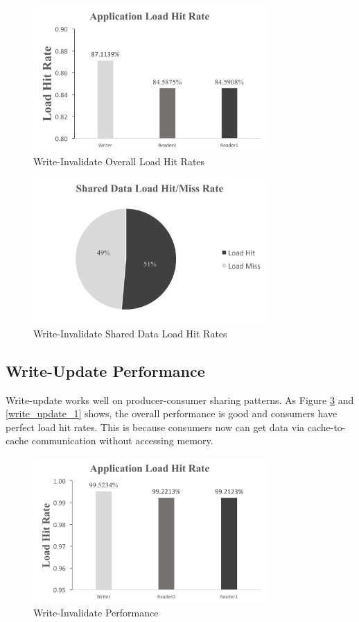 \documentclass[conference]{IEEEtran}
\begin{document}
\begin{figure}[!h]
\centering
\includegraphics[width=3.5in]{write_invalidate.png}
\caption{Write-Invalidate Overall Load Hit Rates}
\label{write_invalidate}
\end{figure}
\FloatBarrier

\begin{figure}[!h]
\centering
\includegraphics[width=3.5in]{write_invalidate_1.png}
\caption{Write-Invalidate Shared Data Load Hit Rates}
\label{write_invalidate_1}
\end{figure}
\FloatBarrier


\subsection{Write-Update Performance}
Write-update works well on producer-consumer sharing patterns. As Figure \ref{write_update} and \ref{write_update_1} shows, the overall performance is good and consumers have perfect load hit rates. This is because consumers now can get data via cache-to-cache communication without accessing memory.

\begin{figure}[!h]
\centering
\includegraphics[width=3.5in]{write_update.png}
\caption{Write-Invalidate Performance}
\label{write_update}
\end{figure}
\FloatBarrier
\end{document}
